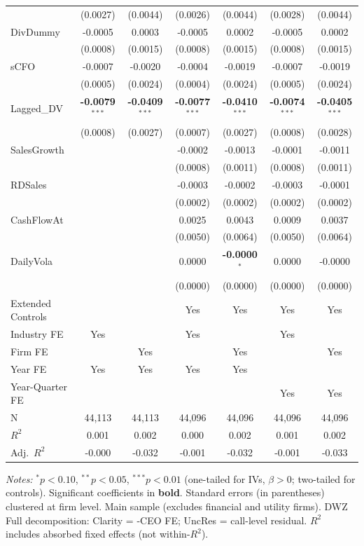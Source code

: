 \begin{landscape}
\begin{table}[H]
\begin{tabular}{lcccccc}
 & (0.0027) & (0.0044) & (0.0026) & (0.0044) & (0.0028) & (0.0044) \\
DivDummy & -0.0005 & 0.0003 & -0.0005 & 0.0002 & -0.0005 & 0.0002 \\
 & (0.0008) & (0.0015) & (0.0008) & (0.0015) & (0.0008) & (0.0015) \\
sCFO & -0.0007 & -0.0020 & -0.0004 & -0.0019 & -0.0007 & -0.0019 \\
 & (0.0005) & (0.0024) & (0.0004) & (0.0024) & (0.0005) & (0.0024) \\
Lagged\_DV & \textbf{-0.0079}$^{***}$ & \textbf{-0.0409}$^{***}$ & \textbf{-0.0077}$^{***}$ & \textbf{-0.0410}$^{***}$ & \textbf{-0.0074}$^{***}$ & \textbf{-0.0405}$^{***}$ \\
 & (0.0008) & (0.0027) & (0.0007) & (0.0027) & (0.0008) & (0.0028) \\
SalesGrowth &  &  & -0.0002 & -0.0013 & -0.0001 & -0.0011 \\
 &  &  & (0.0008) & (0.0011) & (0.0008) & (0.0011) \\
RDSales &  &  & -0.0003 & -0.0002 & -0.0003 & -0.0001 \\
 &  &  & (0.0002) & (0.0002) & (0.0002) & (0.0002) \\
CashFlowAt &  &  & 0.0025 & 0.0043 & 0.0009 & 0.0037 \\
 &  &  & (0.0050) & (0.0064) & (0.0050) & (0.0064) \\
DailyVola &  &  & 0.0000 & \textbf{-0.0000}$^{*}$ & 0.0000 & -0.0000 \\
 &  &  & (0.0000) & (0.0000) & (0.0000) & (0.0000) \\
\midrule
Extended Controls &  &  & Yes & Yes & Yes & Yes \\
Industry FE & Yes &  & Yes &  & Yes &  \\
Firm FE &  & Yes &  & Yes &  & Yes \\
Year FE & Yes & Yes & Yes & Yes &  &  \\
Year-Quarter FE &  &  &  &  & Yes & Yes \\
\midrule
N & 44,113 & 44,113 & 44,096 & 44,096 & 44,096 & 44,096 \\
$R^2$ & 0.001 & 0.002 & 0.000 & 0.002 & 0.001 & 0.002 \\
Adj.~$R^2$ & -0.000 & -0.032 & -0.001 & -0.032 & -0.001 & -0.033 \\
\bottomrule
\end{tabular}
\begin{minipage}{\linewidth}
\vspace{2pt}\scriptsize
\textit{Notes:} $^{*}p<0.10$, $^{**}p<0.05$, $^{***}p<0.01$ (one-tailed for IVs, $\beta > 0$; two-tailed for controls).
 Significant coefficients in \textbf{bold}.
 Standard errors (in parentheses) clustered at firm level.
 Main sample (excludes financial and utility firms). DWZ Full decomposition: Clarity = -CEO FE; UncRes = call-level residual.
 $R^2$ includes absorbed fixed effects (not within-$R^2$).
\end{minipage}
\end{table}
\end{landscape}